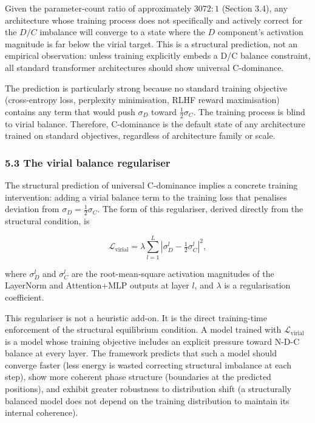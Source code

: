\documentclass[
  11pt,
  letterpaper,
]{article}
\begin{document}
Given the parameter-count ratio of approximately \(3072:1\) (Section
3.4), any architecture whose training process does not specifically and
actively correct for the \(D/C\) imbalance will converge to a state
where the \(D\) component's activation magnitude is far below the virial
target. This is a structural prediction, not an empirical observation:
unless training explicitly embeds a D/C balance constraint, all standard
transformer architectures should show universal C-dominance.

The prediction is particularly strong because no standard training
objective (cross-entropy loss, perplexity minimisation, RLHF reward
maximisation) contains any term that would push \(\sigma_D\) toward
\(\frac{1}{2}\sigma_C\). The training process is blind to virial
balance. Therefore, C-dominance is the default state of any architecture
trained on standard objectives, regardless of architecture family or
scale.

\subsubsection{5.3 The virial balance
regulariser}\label{the-virial-balance-regulariser}

The structural prediction of universal C-dominance implies a concrete
training intervention: adding a virial balance term to the training loss
that penalises deviation from \(\sigma_D = \frac{1}{2}\sigma_C\). The
form of this regulariser, derived directly from the structural
condition, is

\[\mathcal{L}_\text{virial} = \lambda \sum_{l=1}^{L} \left| \sigma_D^l - \tfrac{1}{2}\sigma_C^l \right|^2,\]

where \(\sigma_D^l\) and \(\sigma_C^l\) are the root-mean-square
activation magnitudes of the LayerNorm and Attention+MLP outputs at
layer \(l\), and \(\lambda\) is a regularisation coefficient.

This regulariser is not a heuristic add-on. It is the direct
training-time enforcement of the structural equilibrium condition. A
model trained with \(\mathcal{L}_\text{virial}\) is a model whose
training objective includes an explicit pressure toward N-D-C balance at
every layer. The framework predicts that such a model should converge
faster (less energy is wasted correcting structural imbalance at each
step), show more coherent phase structure (boundaries at the predicted
positions), and exhibit greater robustness to distribution shift (a
structurally balanced model does not depend on the training distribution
to maintain its internal coherence).
\end{document}
